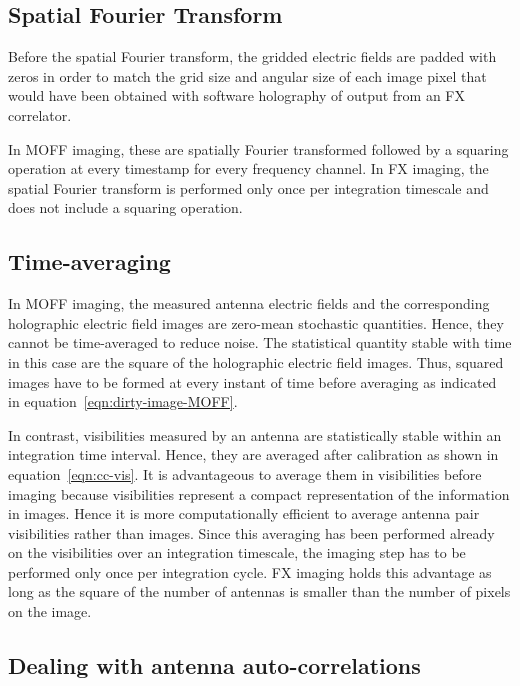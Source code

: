 \documentclass[a4paper,fleqn,usenatbib]{../mnras}
\begin{document}
\subsection{Spatial Fourier Transform}

Before the spatial Fourier transform, the gridded electric fields are padded with
zeros in order to match the grid size and angular size of each image pixel that
would have been obtained with software holography of output from an FX
correlator. 

In MOFF imaging, these are spatially Fourier transformed followed by a squaring
operation at every timestamp for every frequency channel. In FX imaging, the
spatial Fourier transform is performed only once per integration timescale and
does not include a squaring operation.

\subsection{Time-averaging}

In MOFF imaging, the measured antenna electric fields and the corresponding
holographic electric field images are zero-mean stochastic quantities. Hence,
they cannot be time-averaged to reduce noise. The statistical quantity stable
with time in this case are the square of the holographic electric field images.
Thus, squared images have to be formed at every instant of time before averaging
as indicated in equation~\ref{eqn:dirty-image-MOFF}.

In contrast, visibilities measured by an antenna are statistically stable within
an integration time interval. Hence, they are averaged after calibration as shown
in equation~\ref{eqn:cc-vis}. It is advantageous to average them in visibilities
before imaging because visibilities represent a compact representation of the
information in images. Hence it is more computationally efficient to average
antenna pair visibilities rather than images. Since this averaging has been
performed already on the visibilities over an integration timescale, the imaging
step has to be performed only once per integration cycle. FX imaging holds this
advantage as long as the square of the number of antennas is smaller than the
number of pixels on the image. 

\subsection{Dealing with antenna auto-correlations}\label{sec:rm-autocorr}
\end{document}
